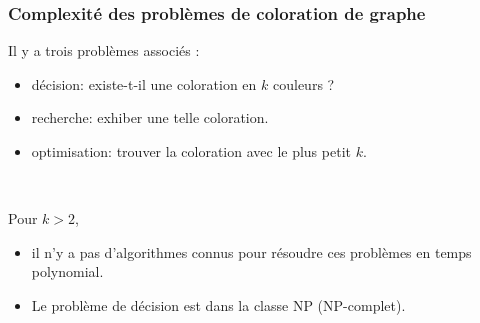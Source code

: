 \documentclass{beamer}
\begin{document}
\begin{frame}
  \frametitle{Complexité des problèmes de coloration de graphe}


  Il y a trois problèmes associés :
  \begin{itemize}
    \item décision:
      existe-t-il une coloration en $k$ couleurs ?
    \item recherche:
      exhiber une telle coloration.
    \item optimisation:
      trouver la coloration avec le plus petit $k$. %
  \end{itemize}

  ~
  
  Pour $k > 2$,
  \begin{itemize}
  \item il n'y a pas d'algorithmes connus pour
    résoudre ces problèmes en temps polynomial.
  \item Le problème de décision est dans la classe NP
    (NP-complet).
  \end{itemize}
\end{frame}
\end{document}
